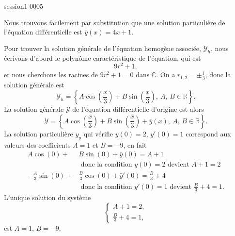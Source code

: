 
\begin{corrige}{session1-0005}

Nous trouvons facilement par substitution que une solution particulière de l'équation différentielle est $\bar y (x)= 4x + 1$. 

Pour trouver la solution générale de l'équation homogène associée, $\mathcal{Y}_h$,  nous écrivons d'abord le polynôme caractéristique de l'équation, qui est 
\begin{equation*}
  9r^2 + 1 , 
\end{equation*}
et nous cherchons les racines de $9r^2 + 1 = 0$ dans $\mathbb{C}$. On a $r_{1,2} = \pm\frac{i}{3}$, donc la solution générale est 
\begin{equation*}
  \mathcal{Y}_h = \left\{A\cos\left(\frac{x}{3}\right)+ B\sin\left(\frac{x}{3}\right), \: A,\,B\in\mathbb{R}\right\}. 
\end{equation*}
La solution générale $\mathcal{Y}$ de l'équation différentielle d'origine est alors 
\begin{equation*}
  \mathcal{Y} = \left\{A\cos\left(\frac{x}{3}\right)+ B\sin\left(\frac{x}{3}\right)+ \bar y(x), \: A,\,B\in\mathbb{R}\right\}. 
\end{equation*}
La solution particulière $y_p$ qui vérifie $y(0) = 2$, $y'(0)=1$ correspond aux valeurs des coefficients $A = 1$ et  $B=-9$, en fait 
\begin{align*}
 A\cos\left(0\right)+& B\sin\left(0\right)+ \bar y(0) = A +1 \\
&\text{ donc la condition } y(0) = 2 \text{ devient } A+1 = 2 \\
 -\frac{A}{3}\sin\left(0\right)+ &\frac{B}{3}\cos\left(0\right)+ \bar y'(0) = \frac{B}{3} + 4\\
 &\text{ donc la condition } y'(0) = 1 \text{ devient } \frac{B}{3} + 4 = 1 .
\end{align*}
 L'unique solution du système 
 \begin{equation*}
   \begin{cases}
     A+1 = 2,\\
\frac{B}{3} + 4 = 1,
   \end{cases}
 \end{equation*}
est $A = 1$, $B=-9$.
\end{corrige}
